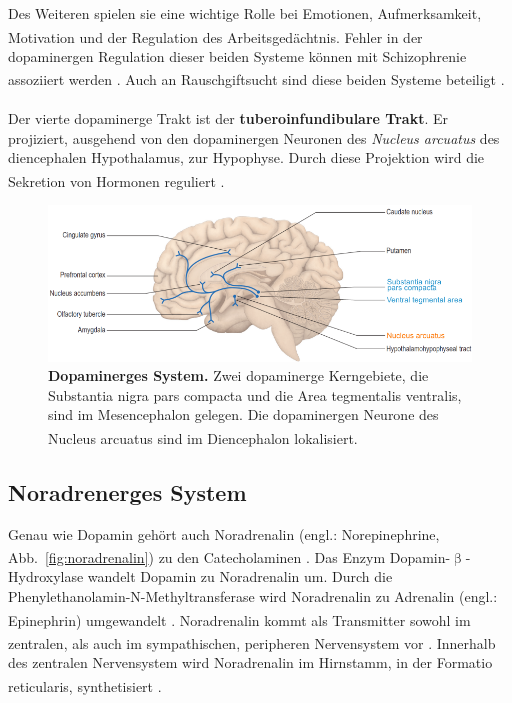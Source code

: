 \documentclass[12pt,a4paper,pdftex]{article}
\begin{document}
Des Weiteren spielen sie eine wichtige Rolle bei Emotionen, Aufmerksamkeit, Motivation \textsuperscript{\cite[13]{kandel2013principles}} und der Regulation des Arbeitsgedächtnis. Fehler in der dopaminergen Regulation dieser beiden Systeme können mit Schizophrenie assoziiert werden \textsuperscript{\cite[67]{kandel2013principles}}.
Auch an Rauschgiftsucht sind diese beiden Systeme beteiligt \textsuperscript{\cite[13]{kandel2013principles}}.
\\
\\
Der vierte dopaminerge Trakt ist der \textbf{tuberoinfundibulare Trakt}. Er projiziert, ausgehend von den dopaminergen Neuronen des \textit{Nucleus arcuatus} des diencephalen Hypothalamus, zur Hypophyse. Durch diese Projektion wird die Sekretion von Hormonen reguliert \textsuperscript{\cite[13]{kandel2013principles}}.


\begin{figure}[H]
    \centering
    \includegraphics[width=\textwidth]{pictures/Bilder_monoamine_systeme/dopaminerges_system.PNG}
    \caption[Dopaminerges System]{\textbf{Dopaminerges System.} Zwei dopaminerge Kerngebiete, die Substantia nigra pars compacta und die Area tegmentalis ventralis, sind im Mesencephalon gelegen. Die dopaminergen Neurone des Nucleus arcuatus sind im Diencephalon lokalisiert. \textsuperscript{\cite[9]{crossman2014neuroanatomy}}}
    \label{fig:dopaminerges_system}
\end{figure}

\subsection{Noradrenerges System}
\label{noradrenerges_system}
Genau wie Dopamin gehört auch Noradrenalin (engl.: Norepinephrine, Abb.~\ref{fig:noradrenalin}) zu den Catecholaminen \textsuperscript{\cite[1]{trepel2011neuroanatomie}}. Das Enzym Dopamin-$\upbeta$-Hydroxylase wandelt Dopamin zu Noradrenalin um. Durch die Phenylethanolamin-N-Methyltransferase wird Noradrenalin zu Adrenalin (engl.: Epinephrin) umgewandelt \textsuperscript{\cite[13]{kandel2013principles}}. Noradrenalin kommt als Transmitter sowohl im zentralen, als auch im sympathischen, peripheren Nervensystem vor \textsuperscript{\cite[4]{crossman2014neuroanatomy}}. Innerhalb des zentralen Nervensystem wird Noradrenalin im Hirnstamm, in der Formatio reticularis, synthetisiert \textsuperscript{\cite[7]{trepel2011neuroanatomie}}.
\end{document}
